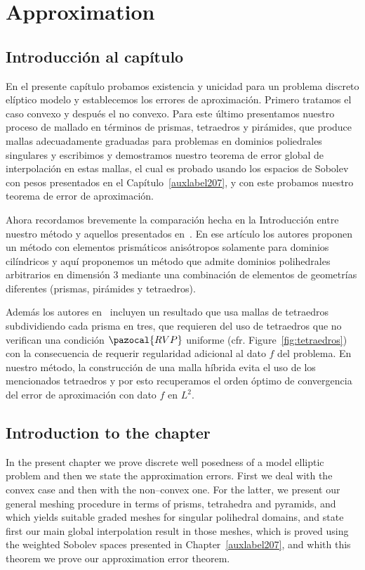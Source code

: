 \chapter{Approximation}\label{auxLabel100}
\section*{Introducci\'on al cap\'itulo}
En el presente cap\'itulo probamos existencia y unicidad
para un problema discreto el\'iptico modelo y establecemos
los errores de aproximaci\'on.
Primero tratamos el caso convexo y despu\'es el no convexo. 
Para este \'ultimo presentamos nuestro proceso de mallado
en t\'erminos de prismas, tetraedros y pir\'amides, que produce
mallas adecuadamente graduadas para problemas en dominios poliedrales singulares
y escribimos y demostramos nuestro teorema de error global de
interpolaci\'on en estas mallas, el cual es probado usando los espacios
de Sobolev con pesos presentados en el Cap\'itulo~\ref{auxlabel207},
y con este probamos nuestro teorema de error de aproximaci\'on.

Ahora recordamos brevemente la comparaci\'on hecha en
la Introducci\'on entre nuestro m\'etodo y 
aquellos presentados en~\cite{MR1866274}. En ese art\'iculo
los autores proponen un m\'etodo con elementos 
prism\'aticos anis\'otropos solamente para
dominios cil\'indricos y aqu\'i proponemos un m\'etodo
que admite dominios polihedrales arbitrarios en
dimensi\'on 3 mediante una combinaci\'on
de elementos de geometr\'ias diferentes (prismas,
pir\'amides y tetraedros).

Adem\'as los autores en~\cite{MR1866274} incluyen
un resultado que usa mallas de tetraedros subdividiendo
cada prisma en tres, que requieren del uso de
tetraedros que no verifican una condici\'on 
$\pazocal{RVP}$ uniforme (cfr. Figure~\ref{fig:tetraedros})
con la consecuencia de requerir regularidad
adicional al dato $f$ del problema. En nuestro m\'etodo,
la construcci\'on de una malla
h\'ibrida evita el uso de los mencionados tetraedros
y por esto recuperamos el orden \'optimo de convergencia
del error de aproximaci\'on con dato $f$ en $L^2$.

\section*{Introduction to the chapter}
In the present chapter we prove
discrete well posedness of a model elliptic problem
and then we state the approximation errors.
First we deal with the convex case and then with the  non--convex
one. For the latter, we present our general meshing procedure
in terms of prisms, tetrahedra and pyramids, and which yields
suitable graded meshes for singular polihedral domains, 
and state first our main
global interpolation result in those meshes, which is proved using the 
weighted Sobolev spaces presented in Chapter~\ref{auxlabel207},
and whith this theorem we prove our approximation error theorem.

